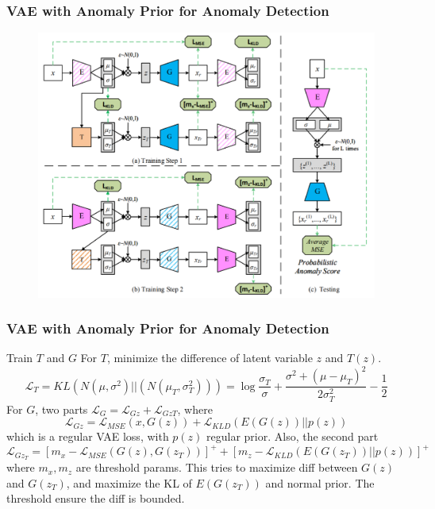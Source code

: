 \documentclass{beamer}
\begin{document}
\begin{frame}
\frametitle{VAE with Anomaly Prior for Anomaly Detection}
\begin{figure}
\includegraphics[width=0.8\linewidth]{figs/vae_anomaly_prior.png}
\end{figure}
\end{frame}

\begin{frame}
\frametitle{VAE with Anomaly Prior for Anomaly Detection}

\begin{block}{Train $T$ and $G$}
For $T$, minimize the difference of latent variable $z$ and $T(z)$.
\[
\mathcal{L}_T = KL(N(\mu, \sigma^2)||(N(\mu_T, \sigma_T^2))) = \log\frac{\sigma_T}{\sigma} + \frac{\sigma^2 + (\mu-\mu_T)^2}{2\sigma_T^2} - \frac{1}{2} 
\]
For $G$, two parts $\mathcal{L}_G = \mathcal{L}_{Gz} + \mathcal{L}_{GzT}$, where
\[
\mathcal{L}_{Gz} = \mathcal{L}_{MSE}(x, G(z)) + \mathcal{L}_{KLD}(E(G(z))||p(z))
\]
which is a regular VAE loss, with $p(z)$ regular prior. Also, the second part
\[
\mathcal{L}_{Gz_T} = [m_x - \mathcal{L}_{MSE}(G(z), G(z_T))]^+ + [m_z - \mathcal{L}_{KLD}(E(G(z_T))||p(z))]^+
\]
where $m_x,m_z$ are threshold params. This tries to maximize diff between $G(z)$ and $G(z_T)$, and maximize the KL of $E(G(z_T))$ and normal prior. The threshold ensure the diff is bounded.
\end{block}
\end{frame}
\end{document}
